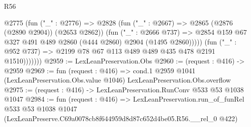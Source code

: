 \begin{lexlean}{R56}
\begin{coremodule}
                  @2775
                    (fun ("_" : @2776) =>
                    @2828
                      (fun ("_" : @2667) => @2865 (@2876 (@2890 @2904)) (@2653 @2862))
                      (fun ("_" : @2666 @737) =>
                      @2854 @159 @67 @327 @491 @489 @2860 (@444 @2860) @2904 (@1495 @2860)))))
                (fun ("_" : @952 @737) => @2199 @78 @67 @113 @489 @489 @435 @478 @2191 @1510)))))))
@2959 := LexLeanPreservation.Obs
@2960 := (request : @416) -> @2959
@2969 := fun (request : @416) =>
  cond.{1} @2959 @1041 (LexLeanPreservation.Obs.value @1046) LexLeanPreservation.Obs.overflow
@2975 := (request : @416) -> LexLeanPreservation.RunConv @533 @53 @1038 @1047
@2984 := fun (request : @416) =>
  LexLeanPreservation.run_of_funRel
    @533
    @53
    @1038
    @1047
    (LexLeanPreserve.C69a0078cb8f644959d8d87c652d4be05.R56.__rel_0 @422)
\end{coremodule}
\end{lexlean}
